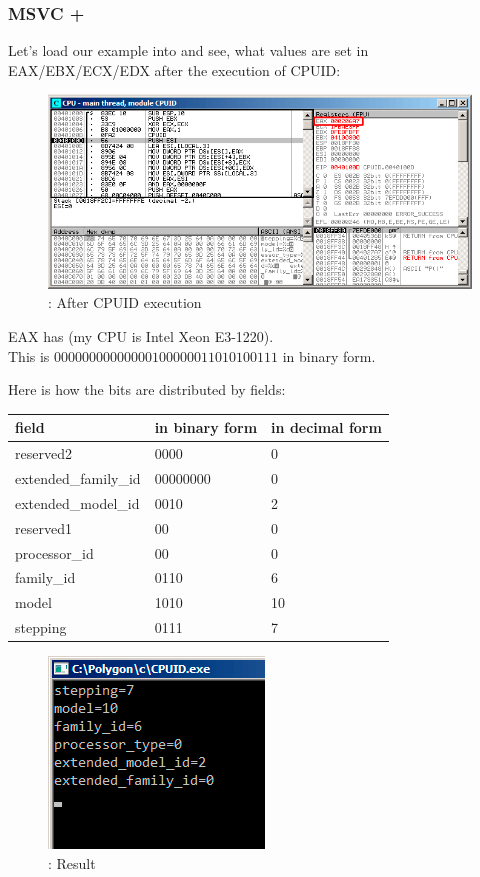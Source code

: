 ﻿\clearpage
\subsubsection{MSVC + \olly}
\myindex{\olly}

Let's load our example into \olly 
and see, what values are set in EAX/EBX/ECX/EDX after the execution of CPUID: 

\begin{figure}[H]
\centering
\includegraphics[scale=\FigScale]{patterns/15_structs/6_bitfields/cpuid/olly.png}
\caption{\olly: After CPUID execution}
\label{fig:cpuid_olly_1}
\end{figure}

EAX has  (my \ac{CPU} is Intel Xeon E3-1220).\\
This is $0000 0000 0000 0010 0000 0110 1010 0111$ in binary form.

Here is how the bits are distributed by fields:

\begin{center}
\begin{tabular}{ | l | l | l | }
\hline
\headercolor{} field &
\headercolor{} in binary form &
\headercolor{} in decimal form \\
\hline
reserved2		& 0000 & 0 \\
\hline
extended\_family\_id	& 00000000 & 0 \\
\hline
extended\_model\_id	& 0010 & 2 \\
\hline
reserved1		& 00 & 0 \\
\hline
processor\_id		& 00 & 0 \\
\hline
family\_id		& 0110 & 6 \\
\hline
model			& 1010 & 10 \\
\hline
stepping		& 0111 & 7 \\
\hline
\end{tabular}
\end{center}

\begin{figure}[H]
\centering
\includegraphics[scale=\NormalScale]{patterns/15_structs/6_bitfields/cpuid/result.png}
\caption{\olly: Result}
\label{fig:cpuid_olly_2}
\end{figure}
